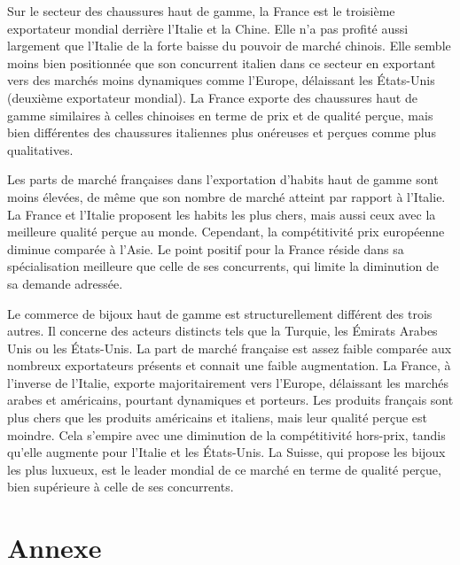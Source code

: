 \documentclass[french,10pt,a4paper]{article}
\begin{document}
\bigskip

Sur le secteur des chaussures haut de gamme, la France est le troisième exportateur mondial derrière l'Italie et la Chine. Elle n'a pas profité aussi largement que l'Italie de la forte baisse du pouvoir de marché chinois. Elle semble moins bien positionnée que son concurrent italien dans ce secteur en exportant vers des marchés moins dynamiques comme l'Europe, délaissant les États-Unis (deuxième exportateur mondial). La France exporte des chaussures haut de gamme similaires à celles chinoises en terme de prix et de qualité perçue, mais bien différentes des chaussures italiennes plus onéreuses et perçues comme plus qualitatives.

\bigskip
Les parts de marché françaises dans l'exportation d'habits haut de gamme sont moins élevées, de même que son nombre de marché atteint par rapport à l'Italie. La France et l'Italie proposent les habits les plus chers, mais aussi ceux avec la meilleure qualité perçue au monde. Cependant, la compétitivité prix européenne diminue comparée à l'Asie. Le point positif pour la France réside dans sa spécialisation meilleure que celle de ses concurrents, qui limite la diminution de sa demande adressée.

\bigskip

Le commerce de bijoux haut de gamme est structurellement différent des trois autres. Il concerne des acteurs distincts tels que la Turquie, les Émirats Arabes Unis ou les États-Unis. La part de marché française est assez faible comparée aux nombreux exportateurs présents et connait une faible augmentation. La France, à l'inverse de l'Italie, exporte majoritairement vers l'Europe, délaissant les marchés arabes et américains, pourtant dynamiques et porteurs. Les produits français sont plus chers que les produits américains et italiens, mais leur qualité perçue est moindre. Cela s'empire avec une diminution de la compétitivité hors-prix, tandis qu'elle augmente pour l'Italie et les États-Unis. La Suisse, qui propose les bijoux les plus luxueux, est le leader mondial de ce marché en terme de qualité perçue, bien supérieure à celle de ses concurrents.

\newpage

\section*{Annexe}
\end{document}

